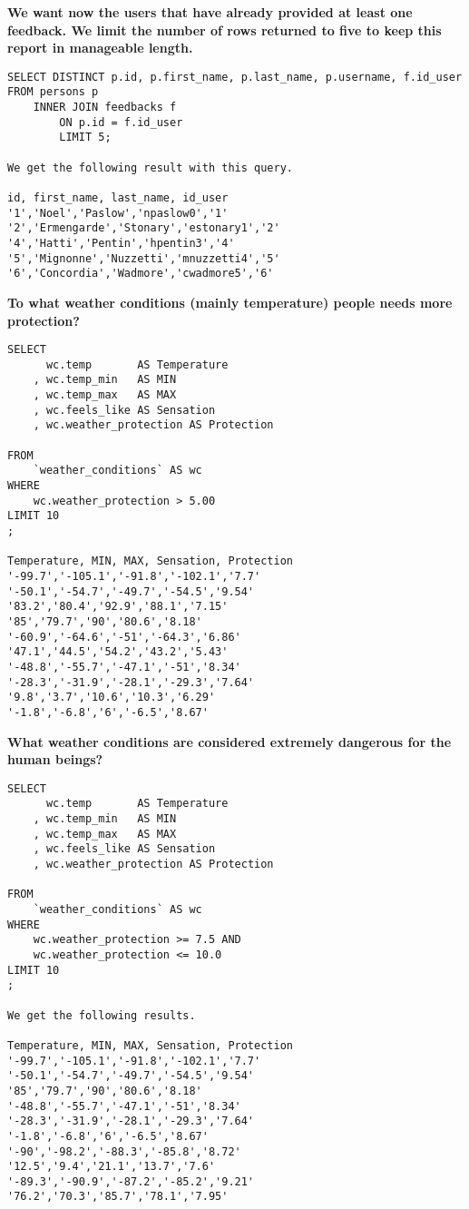 \documentclass[]{article}
\begin{document}
\textbf{We want now the users that have already provided at least one feedback. We limit the number of rows returned to five to keep this report in manageable length.} 

\begin{verbatim}
SELECT DISTINCT p.id, p.first_name, p.last_name, p.username, f.id_user FROM persons p
	INNER JOIN feedbacks f
		ON p.id = f.id_user
        LIMIT 5;

We get the following result with this query.

id, first_name, last_name, id_user 
'1','Noel','Paslow','npaslow0','1'
'2','Ermengarde','Stonary','estonary1','2'
'4','Hatti','Pentin','hpentin3','4'
'5','Mignonne','Nuzzetti','mnuzzetti4','5'
'6','Concordia','Wadmore','cwadmore5','6'
\end{verbatim}

\textbf{To what weather conditions (mainly temperature) people needs more protection?}

\begin{verbatim}
SELECT
	  wc.temp 		AS Temperature
	, wc.temp_min 	AS MIN
	, wc.temp_max 	AS MAX
	, wc.feels_like AS Sensation
	, wc.weather_protection AS Protection

FROM 
	`weather_conditions` AS wc
WHERE
	wc.weather_protection > 5.00
LIMIT 10
;

Temperature, MIN, MAX, Sensation, Protection
'-99.7','-105.1','-91.8','-102.1','7.7'
'-50.1','-54.7','-49.7','-54.5','9.54'
'83.2','80.4','92.9','88.1','7.15'
'85','79.7','90','80.6','8.18'
'-60.9','-64.6','-51','-64.3','6.86'
'47.1','44.5','54.2','43.2','5.43'
'-48.8','-55.7','-47.1','-51','8.34'
'-28.3','-31.9','-28.1','-29.3','7.64'
'9.8','3.7','10.6','10.3','6.29'
'-1.8','-6.8','6','-6.5','8.67'

\end{verbatim}

\textbf{What weather conditions are considered extremely dangerous for the human beings?}

\begin{verbatim}
SELECT
	  wc.temp 		AS Temperature
	, wc.temp_min 	AS MIN
	, wc.temp_max 	AS MAX
	, wc.feels_like AS Sensation
	, wc.weather_protection AS Protection

FROM 
	`weather_conditions` AS wc
WHERE
	wc.weather_protection >= 7.5 AND
	wc.weather_protection <= 10.0
LIMIT 10
;

We get the following results.

Temperature, MIN, MAX, Sensation, Protection
'-99.7','-105.1','-91.8','-102.1','7.7'
'-50.1','-54.7','-49.7','-54.5','9.54'
'85','79.7','90','80.6','8.18'
'-48.8','-55.7','-47.1','-51','8.34'
'-28.3','-31.9','-28.1','-29.3','7.64'
'-1.8','-6.8','6','-6.5','8.67'
'-90','-98.2','-88.3','-85.8','8.72'
'12.5','9.4','21.1','13.7','7.6'
'-89.3','-90.9','-87.2','-85.2','9.21'
'76.2','70.3','85.7','78.1','7.95'

\end{verbatim}
\end{document}
